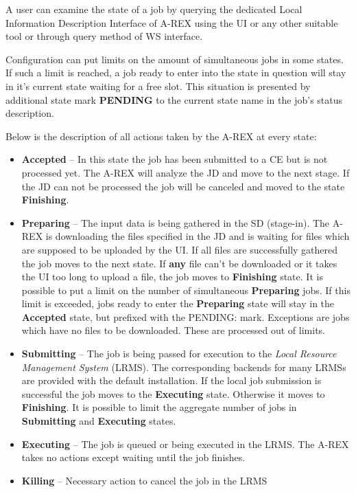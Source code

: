 \documentclass{article}                            %
\begin{document}
A user can examine the state of a job by querying the dedicated Local
Information Description Interface of A-REX using the UI or any other
suitable tool or through query method of WS interface. 

Configuration can put limits on the amount of simultaneous jobs in
some states. If such a limit is reached, a job ready to enter into
the state in question will stay in it's current state waiting for
a free slot. This situation is presented by additional state mark
\textbf{PENDING} to the current state name in the job's status description.

Below is the description of all actions taken by the A-REX at every
state:

\begin{itemize}
\item \textbf{Accepted} -- In this state the job has been submitted to a
CE but is not processed yet. The A-REX will analyze the JD and move
to the next stage. If the JD can not be processed the job will be
canceled and moved to the state \textbf{Finishing}.
\item \textbf{Preparing} -- The input data is being gathered in the SD (stage-in).
The A-REX is downloading the files specified in the JD and is waiting
for files which are supposed to be uploaded by the UI. If all files
are successfully gathered the job moves to the next state. If \textbf{any}
file can't be downloaded or it takes the UI too long to upload a file,
the job moves to \textbf{Finishing} state. It is possible to put a
limit on the number of simultaneous \textbf{Preparing} jobs. If this
limit is exceeded, jobs ready to enter the \textbf{Preparing} state
 will stay in the \textbf{Accepted} state, but prefixed with the PENDING:
mark. Exceptions are jobs which have no files to be downloaded. These
are processed out of limits.
\item \textbf{Submitting} -- The job is being passed for execution to the
\emph{Local Resource Management System} (LRMS). The corresponding
backends for many LRMSs are provided with the default installation.
If the local job submission is successful the job moves to the \textbf{Executing}
state. Otherwise it moves to \textbf{Finishing}. It is possible to
limit the aggregate number of jobs in \textbf{Submitting} and \textbf{Executing}
states.
\item \textbf{Executing} -- The job is queued or being executed in the LRMS.
The A-REX takes no actions except waiting until the job finishes.
\item \textbf{Killing} -- Necessary action to cancel the job in the LRMS

\end{itemize}
\end{document}
